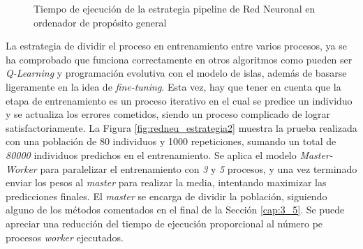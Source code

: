 \begin{figure}[!h]
	\centering
	\caption{Tiempo de ejecución de la estrategia pipeline de Red Neuronal en ordenador de propósito general}
	\label{fig:redneu_estrategia1}
\end{figure}




La estrategia de dividir el proceso en entrenamiento entre varios procesos, ya se ha comprobado que funciona correctamente en otros algoritmos como pueden ser \textit{Q-Learning} y programación evolutiva con el modelo de islas, además de basarse ligeramente en la idea de \textit{fine-tuning}. Esta vez, hay que tener en cuenta que la etapa de entrenamiento es un proceso iterativo en el cual se predice un individuo y se actualiza los errores cometidos, siendo un proceso complicado de lograr satisfactoriamente. La Figura \ref{fig:redneu_estrategia2} muestra la prueba realizada con una población de 80 individuos y 1000 repeticiones, sumando un total de \textit{80000} individuos predichos en el entrenamiento. Se aplica el modelo \textit{Master-Worker} para paralelizar el entrenamiento con \textit{3} y \textit{5} procesos, y una vez terminado enviar los pesos al \textit{master} para realizar la media, intentando maximizar las predicciones finales. El \textit{master} se encarga de dividir la población, siguiendo alguno de los métodos comentados en el final de la Sección \ref{cap:3_5}. Se puede apreciar una reducción del tiempo de ejecución proporcional al número pe procesos \textit{worker} ejecutados.

